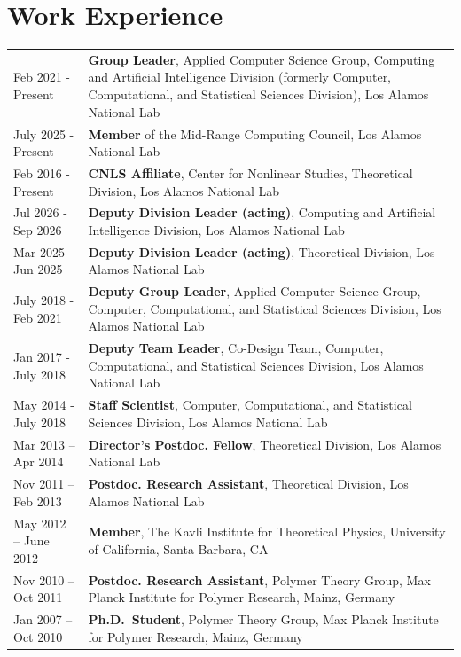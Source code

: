 \documentclass{article}
\begin{document}
\section*{Work Experience}
\vspace{-5mm}
\begin{longtable}{p{}p{}}
Feb 2021 - Present & \textbf{Group Leader}, Applied Computer Science Group, Computing and Artificial Intelligence Division (formerly Computer, Computational, and Statistical Sciences Division), Los Alamos National Lab \\
July 2025 - Present & \textbf{Member} of the Mid-Range Computing Council, Los Alamos National Lab \\
Feb 2016 - Present & \textbf{CNLS Affiliate}, Center for Nonlinear Studies, Theoretical Division, Los Alamos National Lab \\
Jul 2026 - Sep 2026 & \textbf{Deputy Division Leader (acting)}, Computing and Artificial Intelligence Division, Los Alamos National Lab \\
Mar 2025 - Jun 2025 & \textbf{Deputy Division Leader (acting)}, Theoretical Division, Los Alamos National Lab \\
July 2018 - Feb 2021 & \textbf{Deputy Group Leader}, Applied Computer Science Group, Computer, Computational, and Statistical Sciences Division, Los Alamos National Lab \\
Jan 2017 - July 2018 & \textbf{Deputy Team Leader}, Co-Design Team, Computer, Computational, and Statistical Sciences Division, Los Alamos National Lab \\
May 2014 - July 2018 & \textbf{Staff Scientist}, Computer, Computational, and Statistical Sciences Division, Los Alamos National Lab \\
Mar 2013 -- Apr 2014 & \textbf{Director's Postdoc. Fellow}, Theoretical Division, Los Alamos National Lab\\
Nov 2011 -- Feb 2013 & \textbf{Postdoc. Research Assistant}, Theoretical Division, Los Alamos National Lab\\
May 2012 -- June 2012 & \textbf{Member}, The Kavli Institute for Theoretical Physics, University of California, Santa Barbara, CA \\
Nov 2010 -- Oct 2011 & \textbf{Postdoc. Research Assistant}, Polymer Theory Group, Max Planck Institute for Polymer Research, Mainz, Germany\\
Jan 2007 -- Oct 2010 & \textbf{Ph.D.\ Student}, Polymer Theory Group, Max Planck Institute for Polymer Research, Mainz, Germany\\

\end{longtable}
\end{document}
